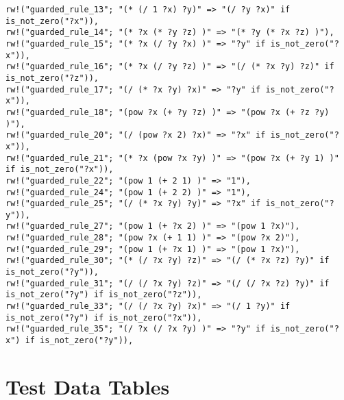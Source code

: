 \begin{lstlisting}
rw!("guarded_rule_13"; "(* (/ 1 ?x) ?y)" => "(/ ?y ?x)" if is_not_zero("?x")),
rw!("guarded_rule_14"; "(* ?x (* ?y ?z) )" => "(* ?y (* ?x ?z) )"),
rw!("guarded_rule_15"; "(* ?x (/ ?y ?x) )" => "?y" if is_not_zero("?x")),
rw!("guarded_rule_16"; "(* ?x (/ ?y ?z) )" => "(/ (* ?x ?y) ?z)" if is_not_zero("?z")),
rw!("guarded_rule_17"; "(/ (* ?x ?y) ?x)" => "?y" if is_not_zero("?x")),
rw!("guarded_rule_18"; "(pow ?x (+ ?y ?z) )" => "(pow ?x (+ ?z ?y) )"),
rw!("guarded_rule_20"; "(/ (pow ?x 2) ?x)" => "?x" if is_not_zero("?x")),
rw!("guarded_rule_21"; "(* ?x (pow ?x ?y) )" => "(pow ?x (+ ?y 1) )" if is_not_zero("?x")),
rw!("guarded_rule_22"; "(pow 1 (+ 2 1) )" => "1"),
rw!("guarded_rule_24"; "(pow 1 (+ 2 2) )" => "1"),
rw!("guarded_rule_25"; "(/ (* ?x ?y) ?y)" => "?x" if is_not_zero("?y")),
rw!("guarded_rule_27"; "(pow 1 (+ ?x 2) )" => "(pow 1 ?x)"),
rw!("guarded_rule_28"; "(pow ?x (+ 1 1) )" => "(pow ?x 2)"),
rw!("guarded_rule_29"; "(pow 1 (+ ?x 1) )" => "(pow 1 ?x)"),
rw!("guarded_rule_30"; "(* (/ ?x ?y) ?z)" => "(/ (* ?x ?z) ?y)" if is_not_zero("?y")),
rw!("guarded_rule_31"; "(/ (/ ?x ?y) ?z)" => "(/ (/ ?x ?z) ?y)" if is_not_zero("?y") if is_not_zero("?z")),
rw!("guarded_rule_33"; "(/ (/ ?x ?y) ?x)" => "(/ 1 ?y)" if is_not_zero("?y") if is_not_zero("?x")),
rw!("guarded_rule_35"; "(/ ?x (/ ?x ?y) )" => "?y" if is_not_zero("?x") if is_not_zero("?y")),
\end{lstlisting}

\newpage
\section{Test Data Tables}
\label{app:data}

